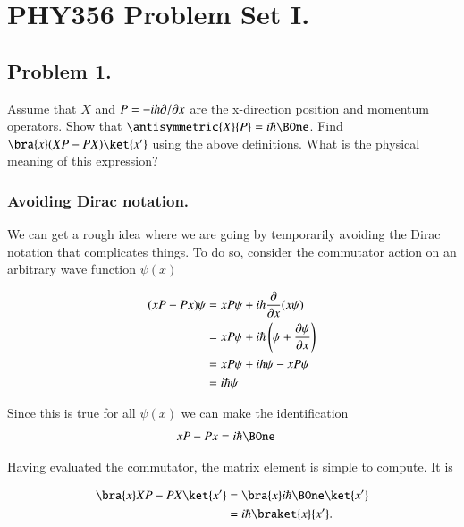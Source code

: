 %
%
%
\chapter{PHY356 Problem Set I.}
\label{chap:qmIproblemSet1}
\date{Oct 7, 2010}

\beginArtNoToc

\section{Problem 1.}

Assume that $X$ and $P = -i \hbar {\partial {}}/{\partial {x}}$ are the x-direction position and momentum operators. Show that $\antisymmetric{X}{P}=i\hbar \BOne$. Find $\bra{x}(XP-PX)\ket{x'}$ using the above definitions. What is the physical meaning of this expression?

\subsection{Avoiding Dirac notation.}

We can get a rough idea where we are going by temporarily avoiding the Dirac notation that complicates things.  To do so, consider the commutator action on an arbitrary wave function $\psi(x)$

\begin{align*}
(x P - P x)\psi
&=
x P \psi + i\hbar \frac{\partial {}}{\partial {x}} (x \psi) \\
&=
x P \psi + i\hbar \left(\psi + \frac{\partial {\psi}}{\partial {x}} \right) \\
&=
x P \psi + i \hbar \psi - x P \psi \\
&=
i \hbar \psi
\end{align*}

Since this is true for all $\psi(x)$ we can make the identification
\begin{align}\label{eqn:qmIproblemSet1:1}
x P - P x &= i\hbar \BOne
\end{align}

Having evaluated the commutator, the matrix element is simple to compute.  It is

\begin{align*}
\bra{x} XP - PX \ket{x'}
&=
\bra{x} i \hbar \BOne \ket{x'} \\
&=
i \hbar \braket{x}{x'}.
\end{align*}

